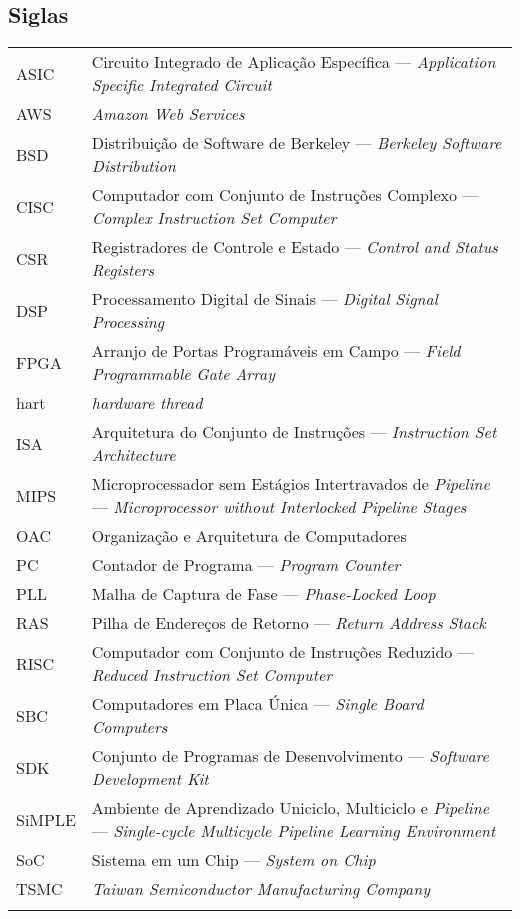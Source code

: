 \subsection*{Siglas}

\begin{tabular}{p{}p{}}
    {ASIC}      & {Circuito Integrado de Aplicação Específica --- \textit{Application Specific Integrated Circuit}}\tabularnewline{}
    {AWS}       & {\textit{Amazon Web Services}} \tabularnewline{}
    {BSD}       & {Distribuição de Software de Berkeley --- \textit{Berkeley Software Distribution}}\tabularnewline{}
    {CISC}      & {Computador com Conjunto de Instruções Complexo --- \textit{Complex Instruction Set Computer}} \tabularnewline{}
    {CSR}       & {Registradores de Controle e Estado --- \textit{Control and Status Registers}} \tabularnewline{}
    {DSP}       & {Processamento Digital de Sinais --- \textit{Digital Signal Processing}} \tabularnewline{}
    {FPGA}      & {Arranjo de Portas Programáveis em Campo --- \textit{Field Programmable Gate Array}} \tabularnewline{}
    {hart}      & {\textit{hardware thread}} \tabularnewline{}
    {ISA}       & {Arquitetura do Conjunto de Instruções --- \textit{Instruction Set Architecture}} \tabularnewline{}
    {MIPS}      & {Microprocessador sem Estágios Intertravados de \textit{Pipeline} --- \textit{Microprocessor without Interlocked Pipeline Stages}} \tabularnewline{}
    {OAC}       & {Organização e Arquitetura de Computadores} \tabularnewline{}
    {PC}        & {Contador de Programa --- \textit{Program Counter}} \tabularnewline{}
    {PLL}       & {Malha de Captura de Fase --- \textit{Phase-Locked Loop}} \tabularnewline{}
    {RAS}       & {Pilha de Endereços de Retorno --- \textit{Return Address Stack}} \tabularnewline{}
    {RISC}      & {Computador com Conjunto de Instruções Reduzido --- \textit{Reduced Instruction Set Computer}} \tabularnewline{}
    {SBC}       & {Computadores em Placa Única --- \textit{Single Board Computers}} \tabularnewline{}
    {SDK}       & {Conjunto de Programas de Desenvolvimento --- \textit{Software Development Kit}} \tabularnewline{}
    {SiMPLE}    & {Ambiente de Aprendizado Uniciclo, Multiciclo e \textit{Pipeline} --- \textit{Single-cycle Multicycle Pipeline Learning Environment}} \tabularnewline{}
    {SoC}       & {Sistema em um Chip --- \textit{System on Chip}} \tabularnewline{}
    {TSMC}      & {\textit{Taiwan Semiconductor Manufacturing Company}} \tabularnewline{}
\end{tabular}
